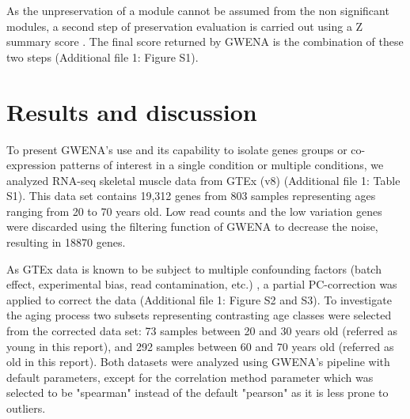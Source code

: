 As the unpreservation of a module cannot be assumed from the non significant modules, a second step of preservation evaluation is carried out using a Z summary score . The final score returned by GWENA is the combination of these two steps (Additional file 1: Figure S1).




\section{Results and discussion}

To present GWENA's use and its capability to isolate genes groups or co-expression patterns of interest in a single condition or multiple conditions, we analyzed RNA-seq skeletal muscle data from GTEx (v8) (Additional file 1: Table S1). This data set contains 19,312 genes from 803 samples representing ages ranging from 20 to 70 years old. Low read counts and the low variation genes were discarded using the filtering function of GWENA to decrease the noise, resulting in 18870 genes.

As GTEx data is known to be subject to multiple confounding factors (batch effect, experimental bias, read contamination, etc.) , a partial PC-correction was applied to correct the data (Additional file 1: Figure S2 and S3). To investigate the aging process two subsets representing contrasting age classes were selected from the corrected data set: 73 samples between 20 and 30 years old (referred as young in this report), and 292 samples between 60 and 70 years old (referred as old in this report). Both datasets were analyzed using GWENA's pipeline with default parameters, except for the correlation method parameter which was selected to be "spearman" instead of the default "pearson" as it is less prone to outliers. 


